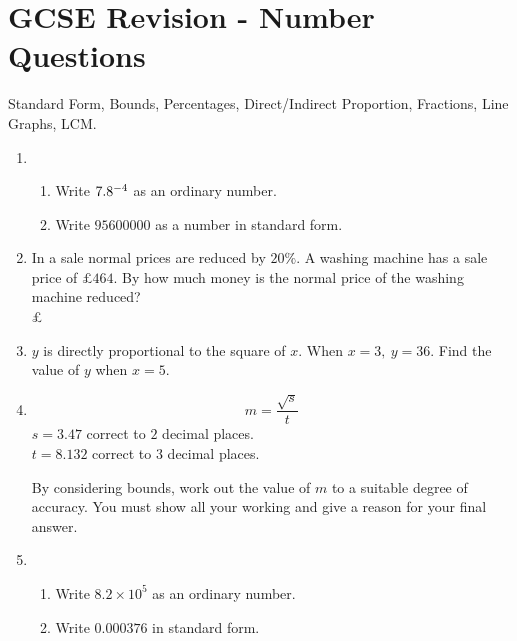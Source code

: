 
\chapter{GCSE Revision - Number Questions}
Standard Form, Bounds, Percentages, Direct/Indirect Proportion, Fractions, Line Graphs, LCM.

\begin{enumerate}
  \item %
  \begin{enumerate}
    \item Write $7.8 \time 10^{-4}$ as an ordinary number.\\[2cm]\vspace*{0pt}\hfill\dline
    \item Write $95 600 000$ as a number in standard form.\\[2cm]\vspace*{0pt}\hfill\dline
  \end{enumerate}
  \item In a sale normal prices are reduced by $20\%$. A washing machine has a sale price of $\pounds 464$. By how much money is the normal price of the washing machine reduced?\\[4cm]\vspace*{0pt}\hfill\pounds\dline
  \item $y$ is directly proportional to the square of $x$. When $x = 3,\ y = 36$. Find the value of $y$ when $x = 5$.\\[2cm]\vspace*{0pt}\hfill\dline
  \item %
  $$
  m = \frac{\sqrt{s}}{t}
  $$
  $s = 3.47$ correct to $2$ decimal places.\\
  $t = 8.132$ correct to $3$ decimal places.\par 
  By considering bounds, work out the value of $m$ to a suitable degree of accuracy. You must show all your working and give a reason for your final answer.\\[3cm]\vspace*{0pt}
  \item %
  \begin{enumerate}
    \item Write $8.2 \times 10^5$ as an ordinary number.\\[1.5cm]\vspace*{0pt}\hfill\dline
    \item Write $0.000376$ in standard form.\\[1.5cm]\vspace*{0pt}\hfill\dline

\end{enumerate}
\end{enumerate}
